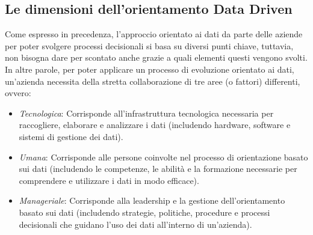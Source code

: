 \subsection{Le dimensioni dell'orientamento Data Driven}
Come espresso in precedenza, l'approccio orientato ai dati da parte delle aziende per poter svolgere processi decisionali si basa su diversi punti chiave, tuttavia, non bisogna dare per scontato anche grazie a quali elementi questi vengono svolti. In altre parole, per poter applicare un processo di evoluzione orientato ai dati, un'azienda necessita della stretta collaborazione di tre aree (o fattori) differenti, ovvero:\cite{emerald_data_driven_dimensions}
\begin{itemize}
    \item \textit{Tecnologica}: Corrisponde all'infrastruttura tecnologica necessaria per raccogliere, elaborare e analizzare i dati (includendo hardware, software e sistemi di gestione dei dati).
    \item \textit{Umana}: Corrisponde alle persone coinvolte nel processo di orientazione basato sui dati (includendo le competenze, le abilità e la formazione necessarie per comprendere e utilizzare i dati in modo efficace).
    \item \textit{Manageriale}: Corrisponde alla leadership e la gestione dell'orientamento basato sui dati (includendo strategie, politiche, procedure e processi decisionali che guidano l'uso dei dati all'interno di un'azienda).
\end{itemize}

